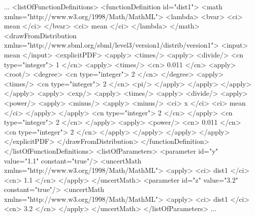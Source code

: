 \documentclass[draftspec]{sbmlpkgspec}
\begin{document}
\begin{example}
...
  <listOfFunctionDefinitions>
    <functionDefinition id="dist1">
      <math xmlns="http://www.w3.org/1998/Math/MathML">
        <lambda>
          <bvar>
            <ci> mean </ci>
          </bvar>
          <ci> mean </ci>
        </lambda>
      </math>
      <drawFromDistribution xmlns="http://www.sbml.org/sbml/level3/version1/distrib/version1">
         <input> mean </input>
         <explicitPDF>
            <apply>
              <times/>
              <apply>
                <divide/>
                <cn type="integer"> 1 </cn>
                <apply>
                  <times/>
                  <cn> 0.011 </cn>
                  <apply>
                    <root/>
                    <degree>
                      <cn type="integer"> 2 </cn>
                    </degree>
                    <apply>
                      <times/>
                      <cn type="integer"> 2 </cn>
                      <pi/>
                    </apply>
                  </apply>
                </apply>
              </apply>
              <apply>
                <exp/>
                <apply>
                  <times/>
                  <apply>
                    <divide/>
                    <apply>
                      <power/>
                      <apply>
                        <minus/>
                        <apply>
                          <minus/>
                          <ci> x </ci>
                          <ci> mean </ci>
                        </apply>
                      </apply>
                      <cn type="integer"> 2 </cn>
                    </apply>
                    <cn type="integer"> 2 </cn>
                  </apply>
                  <apply>
                    <power/>
                    <cn> 0.011 </cn>
                    <cn type="integer"> 2 </cn>
                  </apply>
                </apply>
              </apply>
            </apply>
        </explicitPDF>
      </drawFromDistribution>
    </functionDefinition>
  </listOfFunctionDefinitions>
  <listOfParameters>
    <parameter id="y" value="1.1" constant="true"/>
      <uncertMath xmlns="http://www.w3.org/1998/Math/MathML">
        <apply>
          <ci> dist1 </ci>
          <cn> 1.1 </cn>
        </apply>
      </uncertMath>
    <parameter id="z" value="3.2" constant="true"/>
      <uncertMath xmlns="http://www.w3.org/1998/Math/MathML">
        <apply>
          <ci> dist1 </ci>
          <cn> 3.2 </cn>
        </apply>
      </uncertMath>
  </listOfParameters>
...
\end{example}
\end{document}
